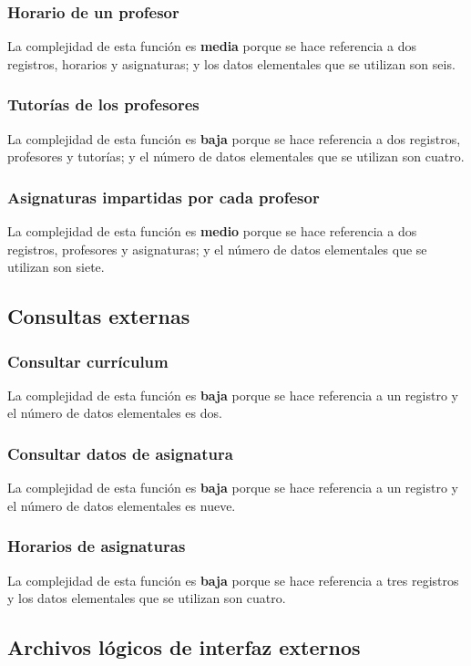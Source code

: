 \documentclass[11pt,a4paper,spanish,twoside]{book}
\begin{document}
\subsubsection{Horario de un profesor}
La complejidad de esta función es \textbf{media} porque se hace referencia a
dos registros, horarios y asignaturas; y los datos elementales que
se utilizan son seis.

\subsubsection{Tutorías de los profesores} 
La complejidad de esta función es \textbf{baja} porque se hace referencia a
dos registros, profesores y tutorías; y el número de datos elementales que se
utilizan son cuatro. 

\subsubsection{Asignaturas impartidas por cada profesor}
La complejidad de esta función es \textbf{medio} porque se hace referencia a
dos registros, profesores y asignaturas; y el número de datos elementales que se
utilizan son siete. 

\subsection{Consultas externas}
\subsubsection{Consultar currículum}
La complejidad de esta función es \textbf{baja} porque se hace referencia a
un registro y el número de datos elementales es dos.

\subsubsection{Consultar datos de asignatura} 
La complejidad de esta función es \textbf{baja} porque se hace referencia a
un registro y el número de datos elementales es nueve.

\subsubsection{Horarios de asignaturas}
La complejidad de esta función es \textbf{baja} porque se hace referencia a
tres registros y los datos elementales que se utilizan son cuatro.

\subsection{Archivos lógicos de interfaz externos}
\end{document}
